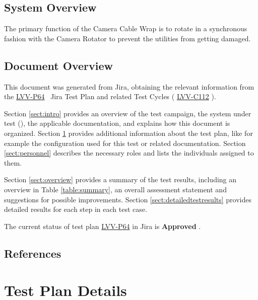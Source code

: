 \documentclass[SE,lsstdraft,STR,toc]{lsstdoc}
\begin{document}
\subsection{System Overview}
\label{sect:systemoverview}

 The primary function of the Camera Cable Wrap is to rotate in a
synchronous fashion with the Camera Rotator to prevent the utilities
from getting damaged.


\subsection{Document Overview}
\label{sect:docoverview}

This document was generated from Jira, obtaining the relevant information from the
\href{https://jira.lsstcorp.org/secure/Tests.jspa\#/testPlan/LVV-P64}{LVV-P64}
~Jira Test Plan and related Test Cycles (
\href{https://jira.lsstcorp.org/secure/Tests.jspa\#/testCycle/LVV-C112}{LVV-C112}
).


Section \ref{sect:intro} provides an overview of the test campaign, the system under test (\product{}),
the applicable documentation, and explains how this document is organized.
Section \ref{sect:testplan} provides additional information about the test plan, like for example the configuration
used for this test or related documentation.
Section \ref{sect:personnel} describes the necessary roles and lists the individuals assigned to them.

Section \ref{sect:overview} provides a summary of the test results, including an overview in Table \ref{table:summary},
an overall assessment statement and suggestions for possible improvements.
Section \ref{sect:detailedtestresults} provides detailed results for each step in each test case.

The current status of test plan \href{https://jira.lsstcorp.org/secure/Tests.jspa\#/testPlan/LVV-P64}{LVV-P64} in Jira is \textbf{ Approved }.

\subsection{References}
\label{sect:references}
\renewcommand{\refname}{}



\newpage
\section{Test Plan Details}
\label{sect:testplan}
\end{document}
